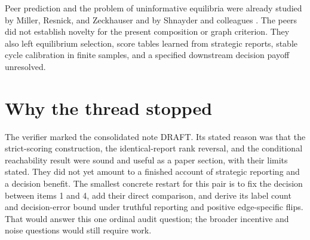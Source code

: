 \documentclass{article}
\begin{document}
Peer prediction and the problem of uninformative equilibria were already studied by Miller, Resnick, and
Zeckhauser \cite{Miller2005} and by Shnayder and colleagues \cite{Shnayder2016}. The peers did not establish
novelty for the present composition or graph criterion. They also left equilibrium selection, score tables
learned from strategic reports, stable cycle calibration in finite samples, and a specified downstream
decision payoff unresolved.

\section{Why the thread stopped}

The verifier marked the consolidated note DRAFT. Its stated reason was that the strict-scoring construction,
the identical-report rank reversal, and the conditional reachability result were sound and useful as a paper
section, with their limits stated. They did not yet amount to a finished account of strategic reporting and a
decision benefit. The smallest concrete restart for this pair is to fix the decision between items 1 and 4,
add their direct comparison, and derive its label count and decision-error bound under truthful reporting and
positive edge-specific flips. That would answer this one ordinal audit question; the broader incentive and
noise questions would still require work.



\end{document}
